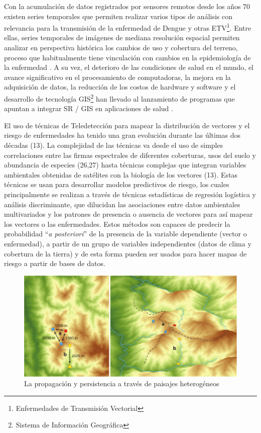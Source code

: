 \par Con la acumulación de datos registrados por sensores remotos desde los años
  70 existen series temporales que permiten realizar varios tipos de análisis con
  relevancia para la transmisión de la enfermedad de Dengue y otras
  ETV\footnote{Enfermedades de Transmisión Vectorial}.
  Entre ellas, series temporales de imágenes de mediana resolución espacial
  permiten analizar en perspectiva histórica los cambios de uso y cobertura del
  terreno, proceso que habitualmente tiene vinculación con cambios en la
  epidemiología de la enfermedad \cite{german_temporal}.
  A su vez, el deterioro de las condiciones de salud en el mundo, el avance significativo
  en el procesamiento de computadoras, la mejora en la adquisición de datos,
  la reducción de los costos de hardware y software y el desarrollo de tecnología
  GIS\footnote{Sistema de Información Geográfica} han llevado al lanzamiento
  de programas que apuntan a integrar SR / GIS en aplicaciones de salud
  \cite{tesis_riesgo_viral, tesis_gonza, espinosa_temporal, rs_public_health}.



\par El uso de técnicas de Teledetección para mapear la distribución de vectores y el riesgo
  de enfermedades ha tenido una gran evolución durante las últimas dos
  décadas (13). La complejidad de las técnicas va desde el uso de simples
  correlaciones entre las firmas espectrales de diferentes coberturas, usos del
  suelo y abundancia de especies (26,27) hasta técnicas complejas que integran variables
  ambientales obtenidas de satélites con la biología de los vectores (13).
  Estas técnicas se usan para desarrollar modelos predictivos de riesgo,
  los cuales principalmente se realizan a través de técnicas estadísticas de
  regresión logística y análisis discriminante, que dilucidan las asociaciones
  entre datos ambientales multivariados y los patrones de presencia o ausencia de
  vectores para así mapear los vectores o las enfermedades.
  Estos métodos son capaces de predecir la probabilidad “\textit{a posteriori}” de la
  presencia de la variable dependiente (vector o enfermedad), a partir de un
  grupo de variables independientes (datos de clima y cobertura de la tierra) y de esta
  forma pueden ser usados para hacer mapas de riesgo a partir de bases de datos.


  \begin{figure}
  \centering%
  \includegraphics[width=1\textwidth]{images/paisajes_heterogeneos}%
  \caption{La propagación y persistencia a través de paisajes heterogéneos}\label{fig:paisajes_h}
  \end{figure}

